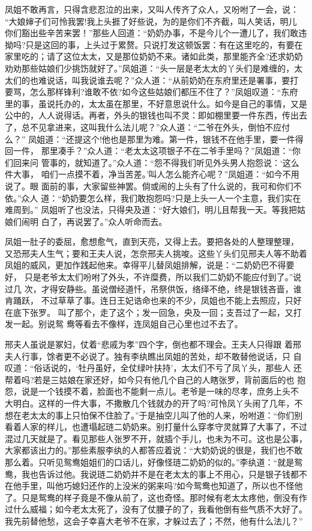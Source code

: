 凤姐不敢再言，只得含悲忍泣的出来，又叫人传齐了众人，又吩咐了一会，说：
“大娘婶子们可怜我罢!我上头捱了好些说，为的是你们不齐截，叫人笑话，明儿
你们豁出些辛苦来罢！”那些人回道：“奶奶办事，不是今儿个一遭儿了，我们敢违
拗吗?只是这回的事，上头过于累赘。只说打发这顿饭罢：有在这里吃的，有要在
家里吃的；请了这位太太，又是那位奶奶不来。诸如此类，那里能齐全?还求奶奶
劝劝那些姑娘们少挑饬就好了。”凤姐道：“头一层是老太太的丫头们是难缠的，太
太们的也难说话，叫我说谁去呢？”众人道：“从前奶奶在东府里还是署事，要打
要骂，怎么那样锋利?谁敢不依?如今这些姑娘们都压不住了？”凤姐叹道：“东府
里的事，虽说托办的，太太虽在那里，不好意思说什么。如今是自己的事情，又是
公中的，人人说得话。再者，外头的银钱也叫不灵：即如棚里要一件东西，传出去
了，总不见拿进来，这叫我什么法儿呢？”众人道：“二爷在外头，倒怕不应付么？”
凤姐道：“还提这个!他也是那里为难。第一件，银钱不在他手里，要一件得回一件，
那里凑手？”众人道：“老太太这项银子不在二爷手里吗？”凤姐道：“你们回来问
管事的，就知道了。”众人道：“怨不得我们听见外头男人抱怨说：‘这么件大事，
咱们一点摸不着，净当苦差。’叫人怎么能齐心呢？”凤姐道：“如今不用说了。眼
面前的事，大家留些神罢。倘或闹的上头有了什么说的，我可和你们不依。”众人
道：“奶奶要怎么样，我们敢抱怨吗?只是上头一人一个主意，我们实在难周到。”
凤姐听了也没法，只得央及道：“好大娘们，明儿且帮我一天。等我把姑娘们闹明
白了，再说罢了。”众人听命而去。

凤姐一肚子的委屈，愈想愈气，直到天亮，又得上去。要把各处的人整理整理，
又恐邢夫人生气；要和王夫人说，怎奈邢夫人挑唆。这些丫头们见邢夫人等不助着
凤姐的威风，更加作践起他来。幸得平儿替凤姐排解，说是：“二奶奶巴不得要好，
只是老爷太太们吩咐了外头，不许糜费，所以我们二奶奶不能应付到了。”说过几
次，才得安静些。虽说僧经道忏，吊祭供饭，络绎不绝，终是银钱吝啬，谁肯踊跃，
不过草草了事。连日王妃诰命也来的不少，凤姐也不能上去照应，只好在底下张罗。
叫了那个，走了这个；发一回急，央及一回；支吾过了一起，又打发一起。别说鸳
鸯等看去不像样，连凤姐自己心里也过不去了。

邢夫人虽说是冢妇，仗着“悲戚为孝”四个字，倒也都不理会。王夫人只得跟
着邢夫人行事，馀者更不必说了。独有李纨瞧出凤姐的苦处，却不敢替他说话，只
自叹道：“俗话说的，‘牡丹虽好，全仗绿叶扶持’，太太们不亏了凤丫头，那些人
还帮着吗?若是三姑娘在家还好，如今只有他几个自己的人瞎张罗，背前面后的也
抱怨，说是一个钱摸不着，脸面也不能剩一点儿。老爷是一味的尽孝，庶务上头不
大明白。这样的一件大事，不撒散几个钱就办的开了吗?可怜凤丫头闹了几年，不
想在老太太的事上只怕保不住脸了。”于是抽空儿叫了他的人来，吩咐道：“你们别
看着人家的样儿，也遭塌起琏二奶奶来。别打量什么穿孝守灵就算了大事了，不过
混过几天就是了。看见那些人张罗不开，就插个手儿，也未为不可。这也是公事，
大家都该出力的。”那些素服李纨的人都答应着说：“大奶奶说的很是，我们也不敢
那么着。只听见鸳鸯姐姐们的口话儿，好像怪琏二奶奶的似的。”李纨道：“就是鸳
鸯，我也告诉过他。我说琏二奶奶并不是在老太太的事上不用心，只是银子钱都不
在他手里，叫他巧媳妇还作的上没米的粥来吗?如今鸳鸯也知道了，所以也不怪他
了。只是鸳鸯的样子竟是不像从前了，这也奇怪。那时候有老太太疼他，倒没有作
过什么威福；如今老太太死了，没有了仗腰子的了，我看他倒有些气质不大好了。
我先前替他愁，这会子幸喜大老爷不在家，才躲过去了；不然，他有什么法儿？”

